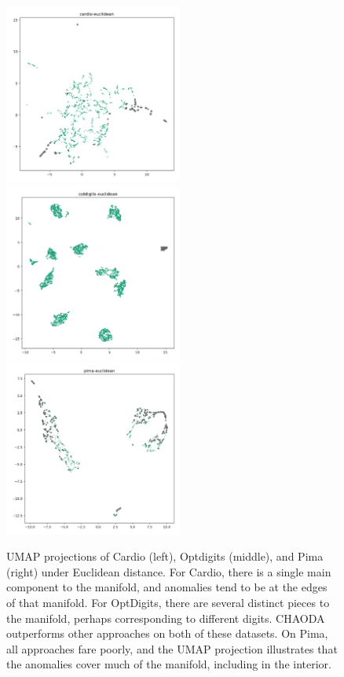 \begin{figure}
   \centering
   \includegraphics[width=2.3in]{images/umaps/cardio-euclidean-umap2d.png}
   \includegraphics[width=2.3in]{images/umaps/optdigits-euclidean-umap2d.png}
   \includegraphics[width=2.3in]{images/umaps/pima-euclidean-umap2d.png}
   \caption{UMAP projections of Cardio (left), Optdigits (middle), and Pima (right) under Euclidean distance.
   For Cardio, there is a single main component to the manifold, and anomalies tend to be at the edges of that manifold.
   For OptDigits, there are several distinct pieces to the manifold, perhaps corresponding to different digits.
   CHAODA outperforms other approaches on both of these datasets. On Pima, all approaches fare poorly, and the UMAP projection illustrates that the anomalies cover much of the manifold, including in the interior.}
   \label{fig:conclusions:umap-embeddings-1}
\end{figure}
